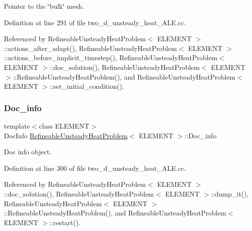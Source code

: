 Pointer to the \char`\"{}bulk\char`\"{} mesh. 



Definition at line 291 of file two\+\_\+d\+\_\+unsteady\+\_\+heat\+\_\+\+A\+L\+E.\+cc.



Referenced by Refineable\+Unsteady\+Heat\+Problem$<$ E\+L\+E\+M\+E\+N\+T $>$\+::actions\+\_\+after\+\_\+adapt(), Refineable\+Unsteady\+Heat\+Problem$<$ E\+L\+E\+M\+E\+N\+T $>$\+::actions\+\_\+before\+\_\+implicit\+\_\+timestep(), Refineable\+Unsteady\+Heat\+Problem$<$ E\+L\+E\+M\+E\+N\+T $>$\+::doc\+\_\+solution(), Refineable\+Unsteady\+Heat\+Problem$<$ E\+L\+E\+M\+E\+N\+T $>$\+::\+Refineable\+Unsteady\+Heat\+Problem(), and Refineable\+Unsteady\+Heat\+Problem$<$ E\+L\+E\+M\+E\+N\+T $>$\+::set\+\_\+initial\+\_\+condition().

\mbox{\label{classRefineableUnsteadyHeatProblem_a9ea9d79a57cb16a6292a637965767f7e}} 
\subsubsection{\texorpdfstring{Doc\+\_\+info}{Doc\_info}}
{\footnotesize\ttfamily template$<$class E\+L\+E\+M\+E\+NT$>$ \\
Doc\+Info \hyperlink{classRefineableUnsteadyHeatProblem}{Refineable\+Unsteady\+Heat\+Problem}$<$ E\+L\+E\+M\+E\+NT $>$\+::Doc\+\_\+info\hspace{0.3cm}{\ttfamily [private]}}



Doc info object. 



Definition at line 300 of file two\+\_\+d\+\_\+unsteady\+\_\+heat\+\_\+\+A\+L\+E.\+cc.



Referenced by Refineable\+Unsteady\+Heat\+Problem$<$ E\+L\+E\+M\+E\+N\+T $>$\+::doc\+\_\+solution(), Refineable\+Unsteady\+Heat\+Problem$<$ E\+L\+E\+M\+E\+N\+T $>$\+::dump\+\_\+it(), Refineable\+Unsteady\+Heat\+Problem$<$ E\+L\+E\+M\+E\+N\+T $>$\+::\+Refineable\+Unsteady\+Heat\+Problem(), and Refineable\+Unsteady\+Heat\+Problem$<$ E\+L\+E\+M\+E\+N\+T $>$\+::restart().

\mbox{\label{classRefineableUnsteadyHeatProblem_a7ff1982af5819bab492c693178be0c24}} 
